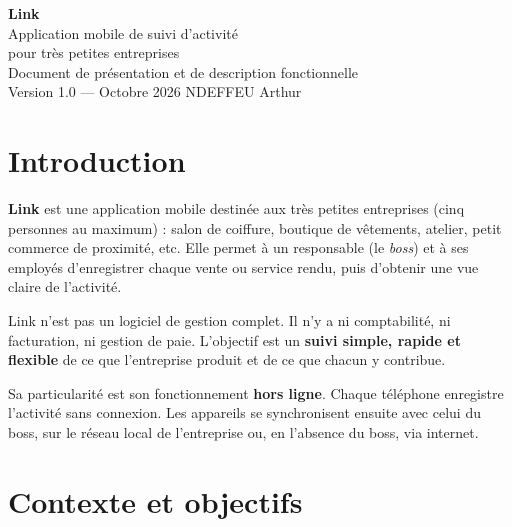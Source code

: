 \documentclass[11pt,a4paper]{article}
\begin{document}
	
	\begin{titlepage}
		\centering
		\vspace*{3cm}
		{\fontsize{48}{56}\selectfont\bfseries\color{linkblue} Link}\\[0.8cm]
		{\Large Application mobile de suivi d'activité\\pour très petites entreprises}\\[5cm]
		{\large Document de présentation et de description fonctionnelle}\\[0.5cm]
		{\color{linkgrey} Version 1.0 --- Octobre 2026}
		\vfill
		{\color{linkgrey}\small NDEFFEU Arthur}
	\end{titlepage}
	
	\tableofcontents
	\newpage
	
	\section{Introduction}
	\textbf{Link} est une application mobile destinée aux très petites entreprises (cinq personnes au maximum) : salon de coiffure, boutique de vêtements, atelier, petit commerce de proximité, etc. Elle permet à un responsable (le \emph{boss}) et à ses employés d'enregistrer chaque vente ou service rendu, puis d'obtenir une vue claire de l'activité.
	
	Link n'est pas un logiciel de gestion complet. Il n'y a ni comptabilité, ni facturation, ni gestion de paie. L'objectif est un \textbf{suivi simple, rapide et flexible} de ce que l'entreprise produit et de ce que chacun y contribue.
	
	Sa particularité est son fonctionnement \textbf{hors ligne}. Chaque téléphone enregistre l'activité sans connexion. Les appareils se synchronisent ensuite avec celui du boss, sur le réseau local de l'entreprise ou, en l'absence du boss, via internet.
	
	\section{Contexte et objectifs}
\end{document}
